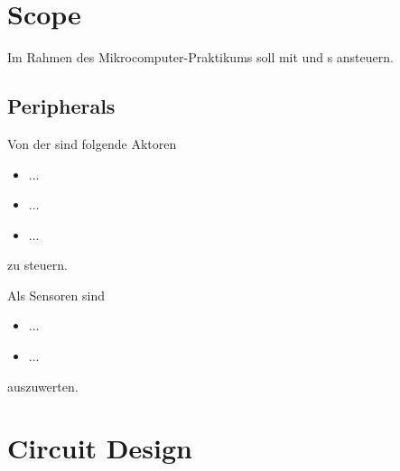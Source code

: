 \documentclass[12pt,fleqn,parskip=half,twoside,toc=index,headings=small,a4paper]{scrreprt}
\begin{document}
	
	\tableofcontents
	\raggedbottom
	\chapter{Scope}
	Im Rahmen des Mikrocomputer-Praktikums soll mit  und s ansteuern.
%	
	\section{Peripherals}
	Von der  sind folgende Aktoren
	\begin{itemize}[noitemsep]
		\item ...
		\item ...
		\item ...
	\end{itemize}
	zu steuern.
	
	Als Sensoren sind
	\begin{itemize}[noitemsep]
		\item ...
		\item ...
	\end{itemize}
	auszuwerten.
	\chapter{Circuit Design}
\end{document}
